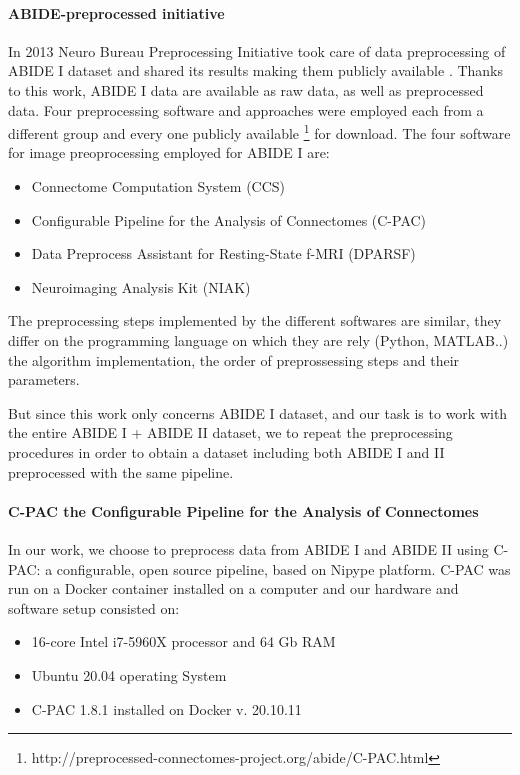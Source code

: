\documentclass[10pt]{report}
\begin{document}
\paragraph{ABIDE-preprocessed initiative}\hfill

In 2013 Neuro Bureau Preprocessing Initiative took care of data preprocessing of ABIDE I dataset and shared its results making them publicly available \cite{cameron2013}.
Thanks to this work, ABIDE I data are available as raw data, as well as preprocessed data.
Four preprocessing software and approaches were employed each from a different group and every one publicly available \footnote{http://preprocessed-connectomes-project.org/abide/C-PAC.html} for download.
The four software for image preoprocessing employed for ABIDE I are:
\begin{itemize}
\item Connectome Computation System (CCS)
\item Configurable Pipeline for the Analysis of Connectomes (C-PAC)
\item Data Preprocess Assistant for Resting-State f-MRI (DPARSF)
\item Neuroimaging Analysis Kit (NIAK)
\end{itemize}
The preprocessing steps implemented by the different softwares are similar, they differ on the programming language on which they are rely (Python, MATLAB..) the algorithm implementation, the order of preprossessing steps and their parameters.

But since this work only concerns ABIDE I dataset, and our task is to work with the entire ABIDE I + ABIDE II dataset, we to repeat the preprocessing procedures in order to obtain a dataset including both ABIDE I and II preprocessed with the same pipeline.

\paragraph{C-PAC the Configurable Pipeline for the Analysis of Connectomes}\hfill

In our work, we choose to preprocess data from ABIDE I and ABIDE II using C-PAC: a configurable, open source pipeline, based on Nipype platform.
C-PAC was run on a Docker container installed on a computer and our hardware and software setup consisted on:
\begin{itemize}
\item 16-core Intel i7-5960X processor and 64 Gb RAM
\item Ubuntu 20.04 operating System
\item C-PAC 1.8.1 installed on Docker v. 20.10.11
\end{itemize}
\end{document}
